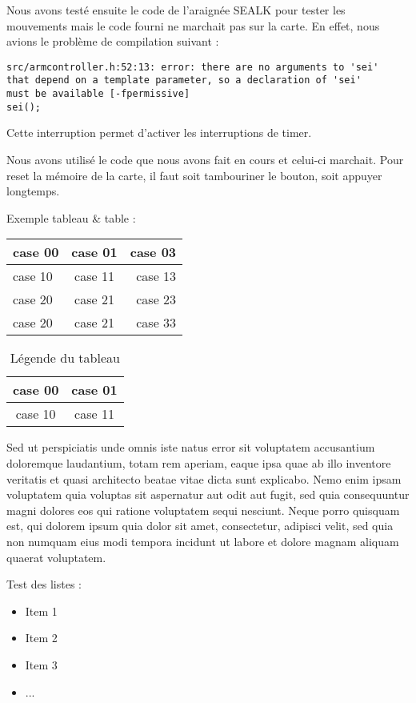 Nous avons testé ensuite le code de l'araignée SEALK pour tester les mouvements mais le code fourni ne marchait pas sur la carte.
En effet, nous avions le problème de compilation suivant :
\begin{lstlisting}
src/armcontroller.h:52:13: error: there are no arguments to 'sei' 
that depend on a template parameter, so a declaration of 'sei' 
must be available [-fpermissive]
sei();
\end{lstlisting}
Cette interruption permet d'activer les interruptions de timer.

Nous avons utilisé le code que nous avons fait en cours et celui-ci marchait.
Pour reset la mémoire de la carte, il faut soit tambouriner le bouton, soit appuyer longtemps.

Exemple tableau \& table : 

\begin{tabular}{|l|c|r|}
	\hline \textbf{case 00} & \textbf{case 01} & \textbf{case 03} \\
	\hline case 10 & case 11 & case 13 \\ 
	case 20 & case 21 & case 23 \\ 
	case 20 & case 21 & case 33 \\ 
	\hline
\end{tabular}

\begin{table}
\begin{center}
	\begin{tabular}{|c|c|}
		\hline case 00 & case 01 \\
		\hline case 10 & case 11 \\ 
		\hline 
	\end{tabular}
	\caption{Légende du tableau}
\end{center}
\end{table}


Sed ut perspiciatis unde omnis iste natus error sit voluptatem accusantium doloremque laudantium, totam rem aperiam, eaque ipsa quae ab illo inventore veritatis et quasi architecto beatae vitae dicta sunt explicabo. Nemo enim ipsam voluptatem quia voluptas sit aspernatur aut odit aut fugit, sed quia consequuntur magni dolores eos qui ratione voluptatem sequi nesciunt. Neque porro quisquam est, qui dolorem ipsum quia dolor sit amet, consectetur, adipisci velit, sed quia non numquam eius modi tempora incidunt ut labore et dolore magnam aliquam quaerat voluptatem. 

Test des listes : 

\begin{itemize}
	\item Item 1
	\item Item 2
	\item Item 3
	\item ...
\end{itemize}



